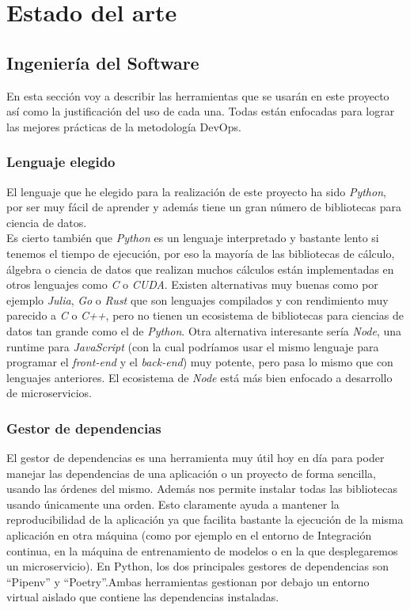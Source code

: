 \chapter{Estado del arte}

\section{Ingeniería del Software}

En esta sección voy a describir las herramientas que se usarán en este proyecto así como la justificación del uso de cada una. Todas están enfocadas para lograr las mejores prácticas de la metodología DevOps.

\subsection{Lenguaje elegido}

El lenguaje que he elegido para la realización de este proyecto ha sido \textit{Python}, por ser muy fácil de aprender y además tiene un gran número de bibliotecas para ciencia de datos.\\

Es cierto también que \textit{Python} es un lenguaje interpretado y bastante lento si tenemos el tiempo de ejecución, por eso la mayoría de las bibliotecas de cálculo, álgebra o ciencia de datos que realizan muchos cálculos están implementadas en otros lenguajes como \textit{C} o \textit{CUDA}. Existen alternativas muy buenas como por ejemplo \textit{Julia}, \textit{Go} o \textit{Rust} que son lenguajes compilados y con rendimiento muy parecido a \textit{C} o \textit{C++}, pero no tienen un ecosistema de bibliotecas para ciencias de datos tan grande como el de \textit{Python}. Otra alternativa interesante sería \textit{Node}, una runtime para \textit{JavaScript} (con la cual podríamos usar el mismo lenguaje para programar el \textit{front-end} y el \textit{back-end}) muy potente, pero pasa lo mismo que con lenguajes anteriores. El ecosistema de \textit{Node} está más bien enfocado a desarrollo de microservicios.

\subsection{Gestor de dependencias}

El gestor de dependencias es una herramienta muy útil hoy en día para poder manejar las dependencias de una aplicación o un proyecto de forma sencilla, usando las órdenes del mismo. Además nos permite instalar todas las bibliotecas usando únicamente una orden. Esto claramente ayuda a mantener la reproducibilidad de la aplicación ya que facilita bastante la ejecución de la misma aplicación en otra máquina (como por ejemplo en el entorno de Integración continua, en la máquina de entrenamiento de modelos o en la que desplegaremos un microservicio). En Python, los dos principales gestores de dependencias son \enquote{Pipenv} y \enquote{Poetry}.Ambas herramientas gestionan por debajo un entorno virtual aislado que contiene las dependencias instaladas.\newline

